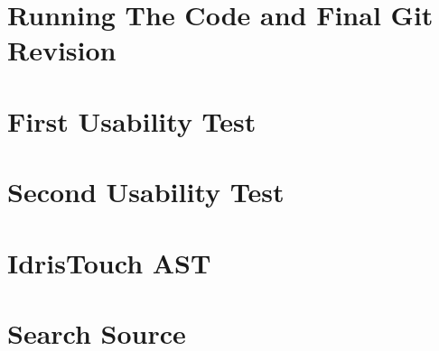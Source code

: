 \appendix
\label{Appendix}
\chapter{Running The Code and Final Git Revision}

\chapter{First Usability Test}
\label{chap:FirstUsabilityTest}

\chapter{Second Usability Test}
\label{chap:SecondUsabilityTest}

\chapter{IdrisTouch AST}
\label{chap:IdrisTouch_AST}



\chapter{Search Source}
\label{chap:SearchSource}
